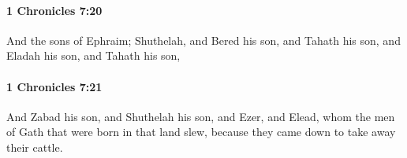 		\paragraph{1 Chronicles 7:20} %
			\label{1CHRONICLES-7-20}

			And the sons of Ephraim; Shuthelah, and Bered his son, and Tahath his son, and Eladah his son, and Tahath his son,


		\paragraph{1 Chronicles 7:21} %
			\label{1CHRONICLES-7-21}

			And Zabad his son, and Shuthelah his son, and Ezer, and Elead, whom the men of Gath that were born in that land slew, because they came down to take away their cattle.


